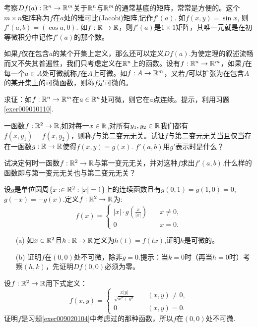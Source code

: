 考察$Df(a):\mathbb{R}^n \to \mathbb{R}^m$关于$\mathbb{R}^n$与$\mathbb{R}^m$的通常基底的矩阵，常常是方便的。这个$m \times n$矩阵称为$f$在$a$处的雅可比(Jacobi)矩阵,记作$f'(a)$. 如$f(x, y) = \sin{x}$, 则$f'(a,b) = (\cos{a}, 0)$. 如$f: \mathbb{R} \to \mathbb{R}$，则$f'(a)$是$1 \times 1$矩阵，其唯一元就是在初等微积分中记作$f'(a)$的那个数。

如果$f$仅在包含$a$的某个开集上定义，那么还可以定义$Df(a)$.为使定理的叙述流畅而又不失其普遍性，我们只考虑定义在$\mathbb{R}^n$上的函数。设有$f:\mathbb{R}^n \to \mathbb{R}^m$，如果$f$在每一个$a \in A$处可微就称$f$在$A$上可微。如$f:A \to \mathbb{R}^m$，又若$f$可以扩张为在包含$A$的某开集上的可微函数，则称$f$是可微的。

\begin{problemset}
\item 求证：如$f:\mathbb{R}^n \to \mathbb{R}^m$在$a \in \mathbb{R}^n$处可微，则它在$a$点连续。提示，利用习题\ref{exer009010110}.

\item 一函数$f: \mathbb{R}^2 \to \mathbb{R}$,如对每一$x \in \mathbb{R}$,对所有$y_1, y_2 \in \mathbb{R}$我们都有$f(x, y_1) = f(x, y_2)$，则称$f$与第二变元无关。试证$f$与第二变元无关当且仅当存在一函数$g:\mathbb{R} \to \mathbb{R}$使得$f(x, y) = g(x)$. $f'(a, b)$用$g'$表示时是什么？

\item 试决定何时一函数$f:\mathbb{R}^2 \to \mathbb{R}$与第一变元无关，并对这种$f$求出$f'(a,b)$.什么样的函数即与第一变元无关也与第二变元无关？

\item\label{exer009020104} 设$g$是单位圆周$\{x : \in \mathbb{R}^2 : |x| = 1\}$上的连续函数且有$g(0, 1) = g(1,0) = 0$, $g(-x) = -g(x)$.定义$f:\mathbb{R}^2 \to \mathbb{R}$为:
\[
f(x) = \left\{
\begin{aligned}
|x|\cdot g\left(\frac{x}{|x|}\right)&\quad x \neq 0,\\
0 &\quad x = 0.
\end{aligned}
\right.
\]
\begin{enumerate}
\item[(a)] 如$x \in \mathbb{R}^2$且$h:\mathbb{R} \to \mathbb{R}$定义为$h(t) = f(tx)$,证明$h$是可微的。
\item[(b)] 证明$f$在$(0, 0)$处不可微，除非$g = 0$.提示：当$k=0$时（再当$h=0$时）考察$(h, k)$，先证明$Df(0, 0)$必须为零。
\end{enumerate}


\item\label{exer009020105} 设$f:\mathbb{R}^2 \to \mathbb{R}$用下式定义：
\[
f(x, y) = \left\{
\begin{aligned}
\frac{x|y|}{\sqrt{x^2 + y^2}} &\quad (x, y) \neq 0,\\
0 &\quad (x, y) = 0.
\end{aligned}
\right.
\]
证明$f$是习题\ref{exer009020104}中考虑过的那种函数，所以$f$在$(0, 0)$处不可微.


\end{problemset}
